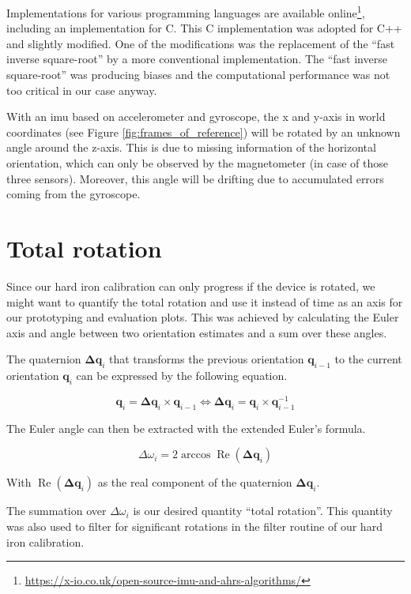 Implementations for various programming languages are available online\footnote{\url{https://x-io.co.uk/open-source-imu-and-ahrs-algorithms/}}, including an implementation for C. This C implementation was adopted for C++ and slightly modified. One of the modifications was the replacement of the ``fast inverse square-root'' by a more conventional implementation. The ``fast inverse square-root'' was producing biases and the computational performance was not too critical in our case anyway.

With an \gls{imu} based on accelerometer and gyroscope, the x and y-axis in world coordinates (see Figure \ref{fig:frames_of_reference}) will be rotated by an unknown angle around the z-axis. This is due to missing information of the horizontal orientation, which can only be observed by the magnetometer (in case of those three sensors). Moreover, this angle will be drifting due to accumulated errors coming from the gyroscope.

\section{Total rotation}

Since our hard iron calibration can only progress if the device is rotated, we might want to quantify the total rotation and use it instead of time as an axis for our prototyping and evaluation plots. This was achieved by calculating the Euler axis and angle between two orientation estimates and a sum over these angles.

The quaternion $\bm{\Delta q}_i$ that transforms the previous orientation $\bm{q}_{i-1}$ to the current orientation $\bm{q}_i$ can be expressed by the following equation.

\begin{equation}
\label{eq:impl_totalrot_q}
    \bm{q}_i = \bm{\Delta q}_i \times \bm{q}_{i-1} \iff \bm{\Delta q}_i = \bm{q}_i \times \bm{q}_{i-1}^{-1}
\end{equation}

The Euler angle can then be extracted with the extended Euler's formula.

\begin{equation}
\label{eq:impl_totalrot}
    \Delta \omega_i = 2 \arccos{\operatorname{Re}(\bm{\Delta q}_i)}
\end{equation}

With $\operatorname{Re}(\bm{\Delta q}_i)$ as the real component of the quaternion $\bm{\Delta q}_i$.

The summation over $\Delta \omega_i$ is our desired quantity ``total rotation''. This quantity was also used to filter for significant rotations in the filter routine of our hard iron calibration.


